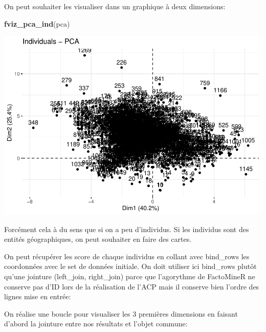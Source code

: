 \documentclass[
]{book}
\newenvironment{Shaded}{\begin{snugshade}}{\end{snugshade}}
\newcommand{\FunctionTok}[1]{\textcolor[rgb]{0.13,0.29,0.53}{\textbf{#1}}}
\newcommand{\NormalTok}[1]{#1}
\newcommand{\OtherTok}[1]{\textcolor[rgb]{0.56,0.35,0.01}{#1}}
\newcommand{\SpecialCharTok}[1]{\textcolor[rgb]{0.81,0.36,0.00}{\textbf{#1}}}
\begin{document}
On peut souhaiter les visualiser dans un graphique à deux dimensions:

\begin{Shaded}
\begin{Highlighting}[]
\FunctionTok{fviz\_pca\_ind}\NormalTok{(pca)}
\end{Highlighting}
\end{Shaded}

\includegraphics{bookdown-demo_files/figure-latex/unnamed-chunk-73-1.pdf}

Forcément cela à du sens que si on a peu d'individus. Si les individus sont des entités géographiques, on peut souhaiter en faire des cartes.

On peut récupérer les score de chaque individus en collant avec bind\_rows les coordonnées avec le set de données initiale. On doit utiliser ici bind\_rows plutôt qu'une jointure (left\_join, right\_join) parce que l'agorythme de FactoMineR ne conserve pas d'ID lors de la réalisation de l'ACP mais il conserve bien l'ordre des lignes mise en entrée:

\begin{Shaded}
\end{Shaded}

On réalise une boucle pour visualiser les 3 premières dimensions en faisant d'abord la jointure entre nos résultats et l'objet commune:
\end{document}
